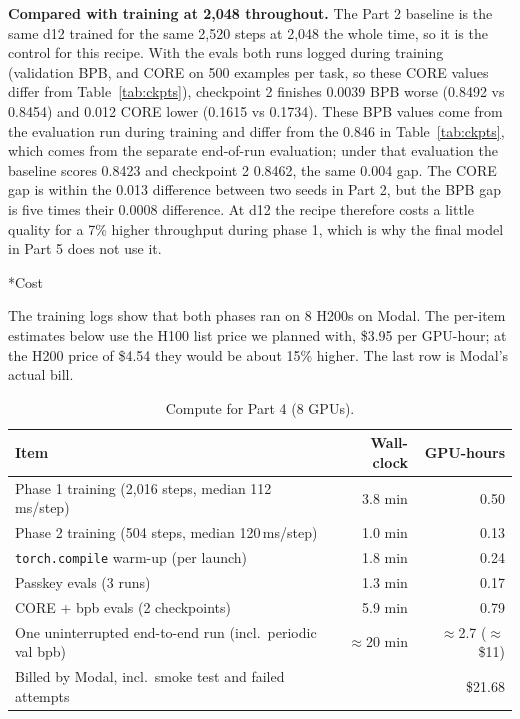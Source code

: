 \documentclass[11pt]{article}
\makeatletter
\renewcommand\subsection{\@startsection{subsection}{2}{\z@}{0.6em}{0.2em}{\normalsize\bfseries}}
\newcommand{\code}[1]{\texttt{#1}}
\makeatother
\begin{document}
\textbf{Compared with training at 2,048 throughout.} The Part 2 baseline is the same d12 trained for the same 2,520 steps at 2,048 the whole time, so it is the control for this recipe. With the evals both runs logged during training (validation BPB, and CORE on 500 examples per task, so these CORE values differ from Table~\ref{tab:ckpts}), checkpoint 2 finishes 0.0039 BPB worse (0.8492 vs 0.8454) and 0.012 CORE lower (0.1615 vs 0.1734). These BPB values come from the evaluation run during training and differ from the 0.846 in Table~\ref{tab:ckpts}, which comes from the separate end-of-run evaluation; under that evaluation the baseline scores 0.8423 and checkpoint 2 0.8462, the same 0.004 gap. The CORE gap is within the 0.013 difference between two seeds in Part 2, but the BPB gap is five times their 0.0008 difference. At d12 the recipe therefore costs a little quality for a 7\% higher throughput during phase 1, which is why the final model in Part 5 does not use it.

\subsection*{Cost}

The training logs show that both phases ran on 8 H200s on Modal. The per-item estimates below use the H100 list price we planned with, \$3.95 per GPU-hour; at the H200 price of \$4.54 they would be about 15\% higher. The last row is Modal's actual bill.

{\small
\renewcommand{\arraystretch}{1.15}
\begin{table}[H]
\centering
\caption{Compute for Part 4 (8 GPUs).}\label{tab:cost4}
\begin{tabular}{l r r}
\toprule
\textbf{Item} & \textbf{Wall-clock} & \textbf{GPU-hours} \\
\midrule
Phase 1 training (2,016 steps, median 112\,ms/step) & 3.8 min & 0.50 \\
Phase 2 training (504 steps, median 120\,ms/step) & 1.0 min & 0.13 \\
\code{torch.compile} warm-up (per launch) & 1.8 min & 0.24 \\
Passkey evals (3 runs) & 1.3 min & 0.17 \\
CORE + bpb evals (2 checkpoints) & 5.9 min & 0.79 \\
\midrule
One uninterrupted end-to-end run (incl.\ periodic val bpb) & $\approx$20 min & $\approx$2.7 ($\approx$\$11) \\
Billed by Modal, incl.\ smoke test and failed attempts & & \$21.68 \\
\bottomrule
\end{tabular}
\end{table}
}
\end{document}
